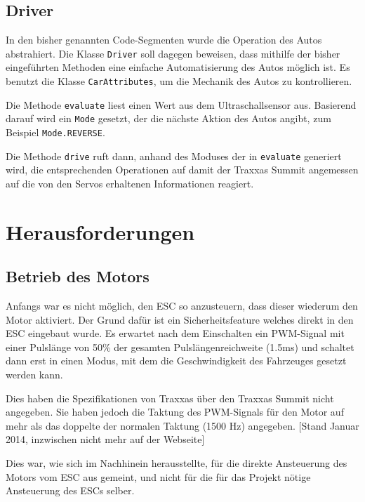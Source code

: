 \documentclass[a4paper,10pt]{scrartcl}
\begin{document}
  \subsection{Driver}

    In den bisher genannten Code-Segmenten wurde die Operation des Autos
    abstrahiert.
    Die Klasse \lstinline{Driver} soll dagegen beweisen, dass mithilfe der
    bisher eingeführten Methoden eine einfache Automatisierung des Autos
    möglich ist.
    Es benutzt die Klasse \lstinline{CarAttributes}, um die Mechanik des Autos
    zu kontrollieren.

    Die Methode \lstinline{evaluate} liest einen Wert aus dem Ultraschallsensor
    aus.
    Basierend darauf wird ein \lstinline{Mode} gesetzt, der die nächste Aktion
    des Autos angibt, zum Beispiel \lstinline{Mode.REVERSE}.

    Die Methode \lstinline{drive} ruft dann, anhand des Moduses der in
    \lstinline{evaluate} generiert wird, die entsprechenden Operationen auf
    damit der Traxxas Summit angemessen auf die von den Servos erhaltenen
    Informationen reagiert.

\section{Herausforderungen}

  \subsection{Betrieb des Motors}

    Anfangs war es nicht möglich, den ESC so anzusteuern, dass dieser wiederum
    den Motor aktiviert.
    Der Grund dafür ist ein Sicherheitsfeature welches direkt in den ESC
    eingebaut wurde.
    Es erwartet nach dem Einschalten ein PWM-Signal mit einer Pulslänge von
    50\% der gesamten Pulslängenreichweite (1.5ms) und schaltet dann erst in
    einen Modus, mit dem die Geschwindigkeit des Fahrzeuges gesetzt werden kann.

    Dies haben die Spezifikationen von Traxxas über den Traxxas Summit nicht
    angegeben.
    Sie haben jedoch die Taktung des PWM-Signals für den Motor auf mehr als das
    doppelte der normalen Taktung (1500 Hz) angegeben. \cite{traxxasspecs}
    [Stand Januar 2014, inzwischen nicht mehr auf der Webseite]

    Dies war, wie sich im Nachhinein herausstellte, für die direkte Ansteuerung
    des Motors vom ESC aus gemeint, und nicht für die für das Projekt nötige
    Ansteuerung des ESCs selber.
\end{document}
